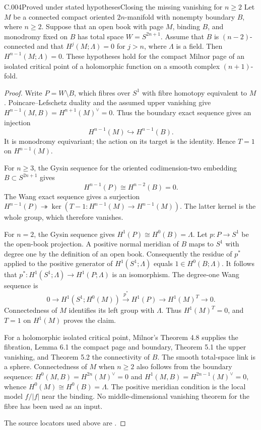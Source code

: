 \begin{saresult}{C.004}{Proved under stated hypotheses}{Closing the missing vanishing for $n\geq2$}
Let $M$ be a connected compact oriented $2n$-manifold with nonempty boundary
$B$, where $n\geq2$. Suppose that an open book with page $M$, binding $B$,
and monodromy fixed on $B$ has total space $W=S^{2n+1}$. Assume that
$B$ is $(n-2)$-connected and that $H^j(M;\Lambda)=0$ for $j>n$, where
$\Lambda$ is a field. Then $H^{n-1}(M;\Lambda)=0$.
These hypotheses hold for the compact Milnor page of an isolated critical
point of a holomorphic function on a smooth complex $(n+1)$-fold.
\end{saresult}
\begin{proof}
Write $P=W\setminus B$, which fibres over $S^1$ with fibre homotopy
equivalent to $M$. Poincare--Lefschetz duality and the assumed upper
vanishing give $H^{n-1}(M,B)=H^{n+1}(M)^\vee=0$.
Thus the boundary exact sequence gives an injection
\[
 H^{n-1}(M)\hookrightarrow H^{n-1}(B).
\]
It is monodromy equivariant; the action on its target is the identity.
Hence $T=1$ on $H^{n-1}(M)$.

For $n\geq3$, the Gysin sequence for the oriented codimension-two embedding
$B\subset S^{2n+1}$ gives
\[
 H^{n-1}(P)\cong H^{n-2}(B)=0.
\]
The Wang exact sequence gives a surjection
$H^{n-1}(P)\twoheadrightarrow
\ker(T-1:H^{n-1}(M)\to H^{n-1}(M))$.
The latter kernel is the whole group, which therefore vanishes.

For $n=2$, the Gysin sequence gives $H^1(P)\cong H^0(B)=\Lambda$.
Let $p:P\to S^1$ be the open-book projection. A positive normal meridian
of $B$ maps to $S^1$ with degree one by the definition of an open book.
Consequently the residue of $p^*$ applied to the positive generator of
$H^1(S^1;\Lambda)$ equals $1\in H^0(B;\Lambda)$.
It follows that $p^*:H^1(S^1;\Lambda)\to H^1(P;\Lambda)$ is an isomorphism.
The degree-one Wang sequence is
\[
 0\longrightarrow H^1(S^1;H^0(M))
 \xrightarrow{p^*}H^1(P)
 \longrightarrow H^1(M)^T\longrightarrow0.
\]
Connectedness of $M$ identifies its left group with $\Lambda$.
Thus $H^1(M)^T=0$, and $T=1$ on $H^1(M)$ proves the claim.

For a holomorphic isolated critical point, Milnor's Theorem 4.8 supplies
the fibration, Lemma 6.1 the compact page and boundary, Theorem 5.1 the
upper vanishing, and Theorem 5.2 the connectivity of $B$.
The smooth total-space link is a sphere. Connectedness of $M$ when
$n\geq2$ also follows from the boundary sequence:
$H^0(M,B)=H^{2n}(M)^\vee=0$ and
$H^1(M,B)=H^{2n-1}(M)^\vee=0$, whence
$H^0(M)\cong H^0(B)=\Lambda$.
The positive meridian condition is the local model $f/|f|$ near the binding.
No middle-dimensional vanishing theorem for the fibre has been used as an input.

The source locators used above are \cite[Theorems~4.8, 5.1--5.2, Lemma~6.1, Lemma~8.4]{C-milnor1968}.
\end{proof}

